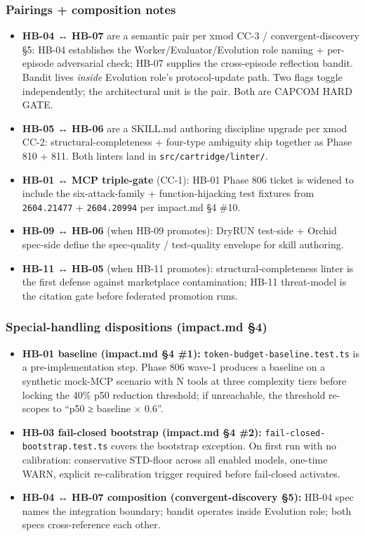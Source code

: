 \documentclass[11pt,letterpaper]{article}
\newcommand{\arxivid}[1]{\texttt{\textcolor{accent}{#1}}}
\providecommand{\tightlist}{\setlength{\itemsep}{0pt}\setlength{\parskip}{0pt}}
\begin{document}
\subsubsection{Pairings + composition
notes}

\begin{itemize}
\tightlist
\item
  \textbf{HB-04 ↔ HB-07} are a semantic pair per xmod CC-3 /
  convergent-discovery §5: HB-04 establishes the
  Worker/Evaluator/Evolution role naming + per-episode adversarial
  check; HB-07 supplies the cross-episode reflection bandit. Bandit
  lives \emph{inside} Evolution role's protocol-update path. Two flags
  toggle independently; the architectural unit is the pair. Both are
  CAPCOM HARD GATE.
\item
  \textbf{HB-05 ↔ HB-06} are a SKILL.md authoring discipline upgrade per
  xmod CC-2: structural-completeness + four-type ambiguity ship together
  as Phase 810 + 811. Both linters land in
  \texttt{src/cartridge/linter/}.
\item
  \textbf{HB-01 ↔ MCP triple-gate} (CC-1): HB-01 Phase 806 ticket is
  widened to include the six-attack-family + function-hijacking test
  fixtures from \arxivid{2604.21477} + \arxivid{2604.20994} per impact.md
  §4 \#10.
\item
  \textbf{HB-09 ↔ HB-06} (when HB-09 promotes): DryRUN test-side +
  Orchid spec-side define the spec-quality / test-quality envelope for
  skill authoring.
\item
  \textbf{HB-11 ↔ HB-05} (when HB-11 promotes): structural-completeness
  linter is the first defense against marketplace contamination; HB-11
  threat-model is the citation gate before federated promotion runs.
\end{itemize}

\subsubsection{Special-handling dispositions (impact.md
§4)}

\begin{itemize}
\tightlist
\item
  \textbf{HB-01 baseline (impact.md §4 \#1):}
  \texttt{token-budget-baseline.test.ts} is a pre-implementation step.
  Phase 806 wave-1 produces a baseline on a synthetic mock-MCP scenario
  with N tools at three complexity tiers before locking the 40\% p50
  reduction threshold; if unreachable, the threshold re-scopes to ``p50
  ≥ baseline × 0.6''.
\item
  \textbf{HB-03 fail-closed bootstrap (impact.md §4 \#2):}
  \texttt{fail-closed-bootstrap.test.ts} covers the bootstrap exception.
  On first run with no calibration: conservative STD-floor across all
  enabled models, one-time WARN, explicit re-calibration trigger
  required before fail-closed activates.
\item
  \textbf{HB-04 ↔ HB-07 composition (convergent-discovery §5):} HB-04
  spec names the integration boundary; bandit operates inside Evolution
  role; both specs cross-reference each other.
\end{itemize}
\end{document}

